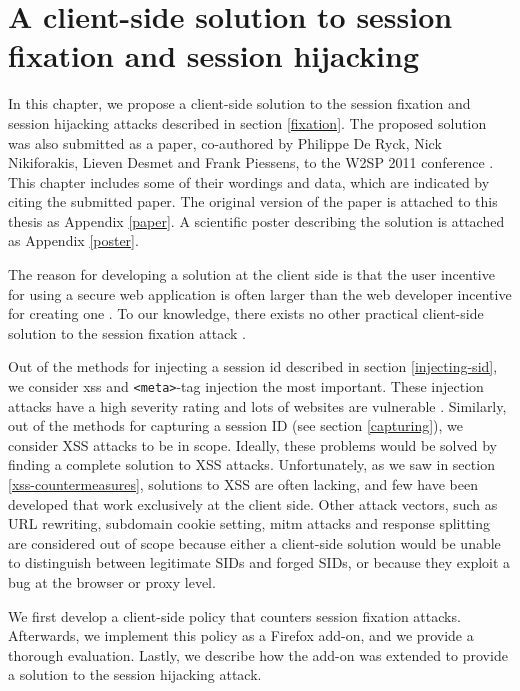\chapter{A client-side solution to session fixation and session hijacking}\label{fixation-solution}

In this chapter, we propose a client-side solution to the \gls{session fixation} and \gls{session hijacking} attacks described in section \ref{fixation}. The proposed solution was also submitted as a paper, co-authored by Philippe De Ryck, Nick Nikiforakis, Lieven Desmet and Frank Piessens, to the W2SP 2011 conference \cite{Bonne2011}. This chapter includes some of their wordings and data, which are indicated by citing the submitted paper. The original version of the paper is attached to this thesis as Appendix \ref{paper}. A scientific poster describing the solution is attached as Appendix \ref{poster}.

The reason for developing a solution at the client side is that the user incentive for using a secure web application is often larger than the web developer incentive for creating one \cite{Johns2011}. To our knowledge, there exists no other practical client-side solution to the session fixation attack \cite{Bonne2011}.

Out of the methods for injecting a \gls{session id} described in section \ref{injecting-sid}, we consider \gls{xss} and \texttt{<meta>}-tag injection the most important. These injection attacks have a high severity rating \cite{Williams2010} and lots of websites are vulnerable \cite{Brown2010}. Similarly, out of the methods for capturing a session ID (see section \ref{capturing}), we consider XSS attacks to be in scope. Ideally, these problems would be solved by finding a complete solution to XSS attacks. Unfortunately, as we saw in section \ref{xss-countermeasures}, solutions to XSS are often lacking, and few have been developed that work exclusively at the client side. Other attack vectors, such as URL rewriting, subdomain cookie setting, \gls{mitm} attacks and response splitting are considered out of scope because either a client-side solution would be unable to distinguish between legitimate SIDs and forged SIDs, or because they exploit a bug at the browser or proxy level.

We first develop a client-side policy that counters session fixation attacks. Afterwards, we implement this policy as a Firefox add-on, and we provide a thorough evaluation. Lastly, we describe how the add-on was extended to provide a solution to the session hijacking attack.

